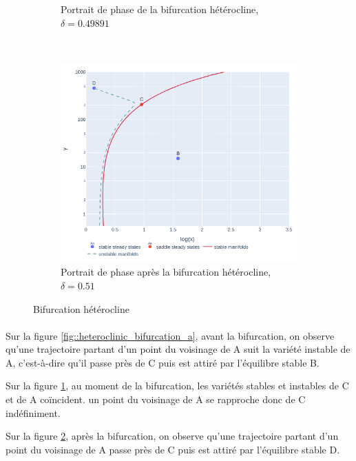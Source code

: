 \documentclass[12pt]{article}
\begin{document}
\begin{figure}[!ht]
\begin{subfigure}[b]{0.4\textwidth}
         \caption{Portrait de phase de la bifurcation hétérocline, $\delta = 0.49891$}
         \label{fig::heteroclinic_bifurcation_b}
     \end{subfigure}\\
     \begin{subfigure}[b]{0.4\textwidth}
         \centering
         \includegraphics[width=\textwidth]{../figures/fig_heteroclinic_after.png}
         \caption{Portrait de phase après la bifurcation hétérocline, $\delta = 0.51$}
         \label{fig::heteroclinic_bifurcation_c}
     \end{subfigure}
    \caption{Bifurcation hétérocline}
    \label{fig::heteroclinic_bifurcation}
\end{figure}
\paragraph{}
Sur la figure \ref{fig::heteroclinic_bifurcation_a}, avant la bifurcation, on observe qu'une trajectoire partant d'un point du voisinage de A suit la variété instable de A, c'est-à-dire qu'il passe près de C  puis est attiré par l'équilibre stable B.

Sur la figure \ref{fig::heteroclinic_bifurcation_b}, au moment de la bifurcation, les variétés stables et instables de C et de A coïncident. un point du voisinage de A se rapproche donc de C indéfiniment. 

Sur la figure \ref{fig::heteroclinic_bifurcation_c}, après la bifurcation, on observe qu'une trajectoire partant d'un point du voisinage de A passe près de C  puis est attiré par l'équilibre stable D.
\end{document}
